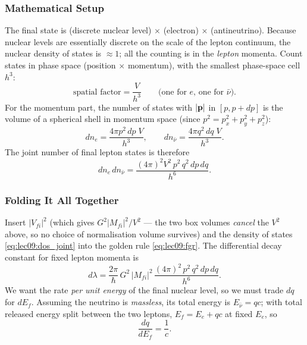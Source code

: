 \subsubsection*{Mathematical Setup}
The final state is (discrete nuclear level) $\times$ (electron) $\times$
(antineutrino). Because nuclear levels are essentially discrete on the scale of
the lepton continuum, the nuclear density of states is $\approx 1$; all the
counting is in the \emph{lepton} momenta. Count states in phase space (position
$\times$ momentum), with the smallest phase-space cell $h^3$:
\begin{equation}
  \label{eq:lec09:dos_space}
  \text{spatial factor} = \frac{V}{h^3}
  \qquad\text{(one for $e$, one for $\bar\nu$)}.
\end{equation}
For the momentum part, the number of states with $|\mathbf{p}|$ in $[p,p+dp]$ is the
volume of a spherical shell in momentum space (since
$p^2=p_x^2+p_y^2+p_z^2$):
\begin{equation}
  \label{eq:lec09:dos_e}
  dn_e = \frac{4\pi p^2\,dp\;V}{h^3},
  \qquad
  dn_{\bar\nu} = \frac{4\pi q^2\,dq\;V}{h^3}.
\end{equation}
The joint number of final lepton states is therefore
\begin{equation}
  \label{eq:lec09:dos_joint}
  dn_e\,dn_{\bar\nu}
  = \frac{(4\pi)^2 V^2\,p^2\,q^2\,dp\,dq}{h^6}.
\end{equation}

\subsubsection*{Folding It All Together}
Insert $|V_{fi}|^2$ (which gives $G^2|M_{fi}|^2 / V^2$ --- the two box volumes
\emph{cancel} the $V^2$ above, so no choice of normalisation volume survives) and
the density of states \eqref{eq:lec09:dos_joint} into the golden rule
\eqref{eq:lec09:fgr}. The differential decay constant for fixed lepton momenta is
\begin{equation}
  \label{eq:lec09:dlambda}
  d\lambda = \frac{2\pi}{\hbar}\,G^2\,|M_{fi}|^2\,
             \frac{(4\pi)^2\,p^2\,q^2\,dp\,dq}{h^6}.
\end{equation}
We want the rate \emph{per unit energy} of the final nuclear level, so we must
trade $dq$ for $dE_f$. Assuming the neutrino is \emph{massless}, its total energy
is $E_{\bar\nu}=qc$; with total released energy split between the two leptons,
$E_f = E_e + qc$ at fixed $E_e$, so
\begin{equation}
  \label{eq:lec09:dqdE}
  \boxed{\frac{dq}{dE_f} = \frac{1}{c}.}
\end{equation}

